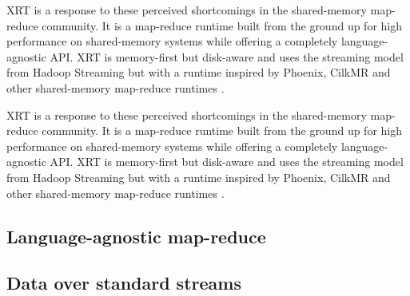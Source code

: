 \documentclass[11pt]{article}       %
\begin{document}
XRT is a response to these perceived shortcomings in the shared-memory
map-reduce community. It is a map-reduce runtime built from the ground up for
high performance on shared-memory systems while offering a completely
language-agnostic API. XRT is memory-first but disk-aware and uses the streaming
model from Hadoop Streaming \cite{} but with a runtime inspired by Phoenix,
CilkMR and other shared-memory map-reduce runtimes \cite{} \cite{}.

XRT is a response to these perceived shortcomings in the shared-memory
map-reduce community. It is a map-reduce runtime built from the ground up for
high performance on shared-memory systems while offering a completely
language-agnostic API. XRT is memory-first but disk-aware and uses the streaming
model from Hadoop Streaming \cite{} but with a runtime inspired by Phoenix,
CilkMR and other shared-memory map-reduce runtimes \cite{} \cite{}.

\subsection{Language-agnostic map-reduce}

\subsection{Data over standard streams}



\end{document}
